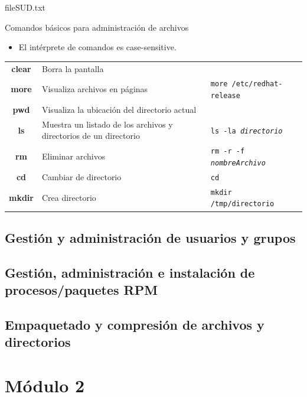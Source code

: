 \documentclass{beamer}
\begin{document}
\begin{frame}{fileSUD.txt}



\end{frame}
\begin{frame}{Comandos básicos para administración de archivos}
\begin{itemize}
    \item El intérprete de comandos es \textit{}{case-sensitive}.
\end{itemize}
{\scriptsize
\begin{tabular}{c|p{6cm}|l}
\hline
\textbf{clear} & Borra la pantalla   &\\
\textbf{more}  & Visualiza archivos en páginas  & \texttt{more /etc/redhat-release}\\
\textbf{pwd} & Visualiza la ubicación del directorio actual   &\\
\textbf{ls} & Muestra un listado de los archivos y directorios de un directorio   & \texttt{ls -la \textit{directorio} }\\
\textbf{rm} & Eliminar archivos   & \texttt{rm -r -f  \textit{nombreArchivo}}\\
\textbf{cd} & Cambiar de directorio   & \texttt{cd} \\
\textbf{mkdir} & Crea directorio   & \texttt{mkdir /tmp/directorio} 
\end{tabular}
 }   
\end{frame}
\subsection{Gestión y administración de usuarios y grupos}
\subsection{Gestión, administración e instalación de procesos/paquetes RPM}
\subsection{Empaquetado y compresión de archivos y directorios}
\section{Módulo 2}


\end{document}
